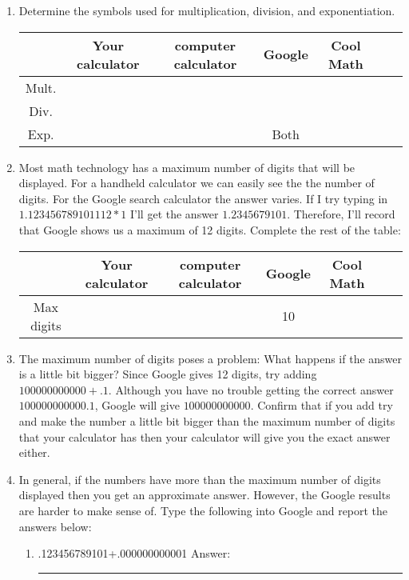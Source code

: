\documentclass[12pt]{article}%
\newcommand\T{\rule{0pt}{3ex}} %
\newcommand\B{\rule[-1.5ex]{0pt}{0pt}}%
\begin{document}
\begin{enumerate}
 \item Determine the symbols used for multiplication, division, and exponentiation.
 \begin{table}[htbp]
 \centering
 \begin{tabular}{|c|c|c|c|c|c|c|}
\hline
 & \T \B Your calculator & computer calculator & Google & Cool Math\\
\hline
\T \B Mult. & &  & &\\
\hline
\T \B Div. & &  & &\\
\hline
\T \B Exp. & & &  Both &\\
\hline
\end{tabular}
\end{table}

\item Most math technology has a maximum number of digits that 
will be displayed. For a handheld calculator we can easily see the 
the number of digits. For the Google search calculator the answer 
varies. If I try typing in $1.123456789101112 \ast 1$ I'll get the 
answer $1.2345679101$. Therefore, I'll record that Google 
shows us a maximum of 12 digits.  Complete the rest of the table:
 \begin{table}[htbp]
 \centering
 \begin{tabular}{|c|c|c|c|c|c|c|}
\hline
 & \T \B Your calculator & computer calculator & Google & Cool Math\\
\hline
\T \B Max digits  & & & 10 &\\
\hline
\end{tabular}
\end{table}
\item The maximum number of digits poses a problem: What happens if the answer is a little
bit bigger? Since Google gives 12 digits, try adding 
$100000000000+.1$. Although you have 
no trouble getting the correct answer $100000000000.1$, Google 
will give $100000000000$. Confirm that if you add try and make 
the number a little bit bigger than the maximum number of digits 
that your calculator has then your calculator will give you the 
exact answer either.
\item In general, if the numbers have more than the maximum number of digits displayed then
you get an approximate answer. However, the Google results are harder to make sense of.
Type the following into Google and report the answers below:
\begin{enumerate}
\item .123456789101+.000000000001  \hspace{20 mm}Answer: \rule{50 mm}{.2pt}

\end{enumerate}
\end{enumerate}
\end{document}

